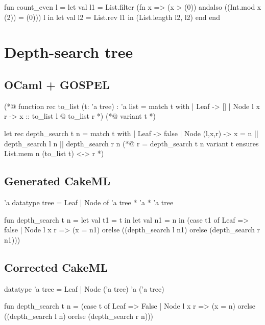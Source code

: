 \begin{cakeml}
fun count_even l =
  let val l1 = List.filter (fn x => (x > (0)) andalso ((Int.mod x (2)) = (0))) l in
  let val l2 = List.rev l1 in (List.length l2, l2) end end
\end{cakeml}

\newpage

\section*{Depth-search tree}

\subsection*{OCaml + GOSPEL}

\begin{gospell}
(*@ function rec to_list (t: 'a tree) : 'a list = 
  match t with
  | Leaf -> []
  | Node l x r -> x :: to_list l @ to_list r
*)
(*@
  variant t
*)

let rec depth_search t n = 
  match t with
  | Leaf -> false
  | Node (l,x,r) -> x = n || depth_search l n || depth_search r n
(*@
  r = depth_search t n
  variant t
  ensures List.mem n (to_list t) <-> r
*)
\end{gospell}

\subsection*{Generated CakeML}

\begin{cakeml}
'a datatype tree = Leaf | Node of 'a tree * 'a * 'a tree

fun depth_search t n = let val t1 = t in
  let val n1 = n in
  (case t1 of
    Leaf => false
  | Node l x r =>
    (x = n1) orelse ((depth_search l n1) orelse (depth_search r n1)))
\end{cakeml}

\subsection*{Corrected CakeML}

\begin{cakeml}
datatype 'a tree = Leaf | Node ('a tree) 'a ('a tree)

fun depth_search t n =
  (case t of
    Leaf => False
  | Node l x r =>
    (x = n) orelse ((depth_search l n) orelse (depth_search r n)))
\end{cakeml}


